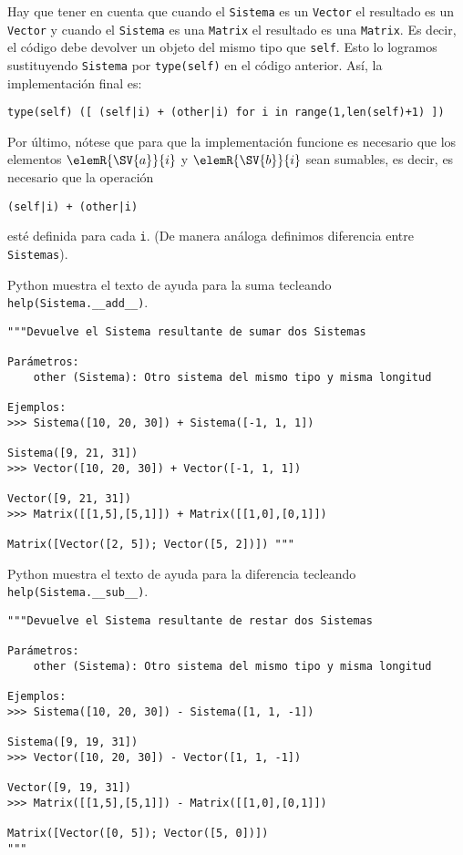 \documentclass[11pt]{report}
\begin{document}
Hay que tener en cuenta que cuando el \texttt{Sistema} es un \texttt{Vector} el
resultado es un \texttt{Vector} y cuando el \texttt{Sistema} es una \texttt{Matrix} el
resultado es una \texttt{Matrix}. Es decir, el código debe devolver un objeto
del mismo tipo que \texttt{self}. Esto lo logramos sustituyendo \texttt{Sistema} por
\texttt{type(self)} en el código anterior. Así, la implementación final es:
\begin{verbatim}
type(self) ([ (self|i) + (other|i) for i in range(1,len(self)+1) ])
\end{verbatim}
Por último, nótese que para que la implementación funcione es
necesario que los elementos \(\elemR{\SV{a}}{i}\) y \(\elemR{\SV{b}}{i}\)
sean sumables, es decir, es necesario que la operación
\begin{verbatim}
(self|i) + (other|i)
\end{verbatim}
esté definida para cada \texttt{i}. (De manera análoga definimos diferencia
entre \texttt{Sistemas}).

Python muestra el texto de ayuda para la suma tecleando \texttt{help(Sistema.\_\_add\_\_)}.
\begin{verbatim}
"""Devuelve el Sistema resultante de sumar dos Sistemas

Parámetros: 
    other (Sistema): Otro sistema del mismo tipo y misma longitud

Ejemplos:
>>> Sistema([10, 20, 30]) + Sistema([-1, 1, 1])

Sistema([9, 21, 31]) 
>>> Vector([10, 20, 30]) + Vector([-1, 1, 1])

Vector([9, 21, 31]) 
>>> Matrix([[1,5],[5,1]]) + Matrix([[1,0],[0,1]]) 

Matrix([Vector([2, 5]); Vector([5, 2])]) """
\end{verbatim}

Python muestra el texto de ayuda para la diferencia tecleando \texttt{help(Sistema.\_\_sub\_\_)}.
\begin{verbatim}
"""Devuelve el Sistema resultante de restar dos Sistemas

Parámetros: 
    other (Sistema): Otro sistema del mismo tipo y misma longitud

Ejemplos:
>>> Sistema([10, 20, 30]) - Sistema([1, 1, -1])

Sistema([9, 19, 31])
>>> Vector([10, 20, 30]) - Vector([1, 1, -1])

Vector([9, 19, 31])
>>> Matrix([[1,5],[5,1]]) - Matrix([[1,0],[0,1]]) 

Matrix([Vector([0, 5]); Vector([5, 0])]) 
"""
\end{verbatim}
\end{document}
